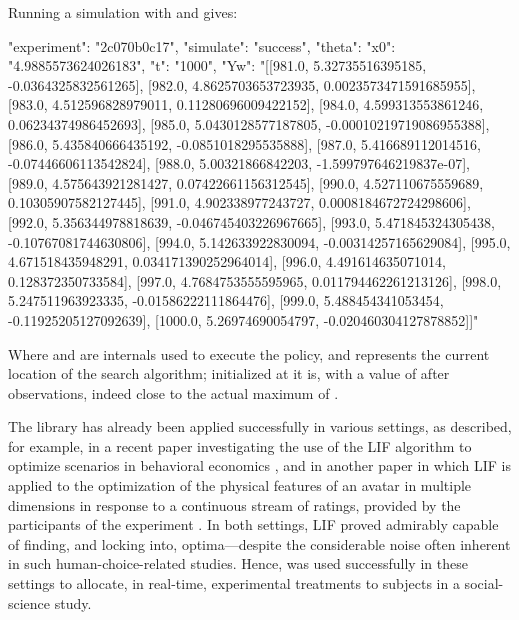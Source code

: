 \documentclass[nojss]{jss}
\begin{document}
Running a simulation with  and  gives:
\begin{Code}
{
    "experiment": "2c070b0c17",
    "simulate": "success",
    "theta": {
        "x0": "4.9885573624026183",
        "t": "1000",
        "Yw": 
        "[[981.0, 5.32735516395185, -0.0364325832561265], 
        [982.0, 4.8625703653723935, 0.0023573471591685955], 
        [983.0, 4.512596828979011, 0.11280696009422152], 
        [984.0, 4.599313553861246, 0.06234374986452693], 
        [985.0, 5.0430128577187805, -0.00010219719086955388], 
        [986.0, 5.435840666435192, -0.0851018295535888], 
        [987.0, 5.416689112014516, -0.07446606113542824], 
        [988.0, 5.00321866842203, -1.599797646219837e-07], 
        [989.0, 4.575643921281427, 0.07422661156312545], 
        [990.0, 4.527110675559689, 0.10305907582127445], 
        [991.0, 4.902338977243727, 0.0008184672724298606], 
        [992.0, 5.356344978818639, -0.046745403226967665], 
        [993.0, 5.471845324305438, -0.10767081744630806], 
        [994.0, 5.142633922830094, -0.00314257165629084], 
        [995.0, 4.671518435948291, 0.034171390252964014], 
        [996.0, 4.491614635071014, 0.128372350733584], 
        [997.0, 4.7684753555595965, 0.011794462261213126], 
        [998.0, 5.247511963923335, -0.01586222111864476], 
        [999.0, 5.488454341053454, -0.11925205127092639], 
        [1000.0, 5.26974690054797, -0.020460304127878852]]"
    }
}
\end{Code}
Where  and  are internals used to execute the policy, and  represents the current location of the search algorithm; initialized at  it is, with a value of  after  observations, indeed close to the actual maximum of .

The  library has already been applied successfully in various settings, as described, for example, in a recent paper investigating the use of the LIF algorithm to optimize scenarios in behavioral economics \citep{kaptein2016tracking}, and in another paper in which LIF is applied to the optimization of the physical features of an avatar in multiple dimensions in response to a continuous stream of ratings, provided by the participants of the experiment \citep{kaptein2016investigation}. In both settings, LIF proved admirably capable of finding, and locking into, optima---despite the considerable noise often inherent in such human-choice-related studies. Hence,  was used successfully in these settings to allocate, in real-time, experimental treatments to subjects in a social-science study.
\end{document}
